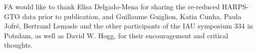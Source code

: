 \documentclass{aa}  %
\begin{document}




\begin{acknowledgements}
FA would like to thank Elisa Delgado-Mena for sharing the re-reduced HARPS-GTO data prior to publication, and Guillaume Guiglion, Katia Cunha, Paula Jofr\'e, Bertrand Lemasle and the other participants of the IAU symposium 334 in Potsdam, as well as David W. Hogg, for their encouragement and critical thoughts. 

\end{acknowledgements}

\end{document}
